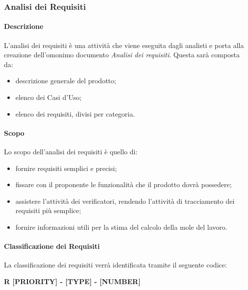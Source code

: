 \subsubsection{Analisi dei Requisiti}
\paragraph{Descrizione} \hfill \break
L'analisi dei requisiti è una attività che viene eseguita dagli analisti e porta alla creazione 
dell'omonimo documento \textit{Analisi dei requisiti}.
Questa sarà composta da:
\begin{itemize}
  \item descrizione generale del prodotto;
  \item elenco dei Casi d'Uso;
  \item elenco dei requisiti, divisi per categoria.
\end{itemize}

\paragraph{Scopo} \hfill \break
Lo scopo dell'analisi dei requisiti è quello di:
\begin{itemize}
  \item fornire requisiti semplici e precisi;
  \item fissare con il proponente le funzionalità che il prodotto dovrà possedere;
  \item assistere l'attività dei verificatori, rendendo l'attività di tracciamento dei requisiti più semplice;
  \item fornire informazioni utili per la stima del calcolo della mole del lavoro.
\end{itemize}

\paragraph{Classificazione dei Requisiti} \hfill \break
La classificazione dei requisiti verrà identificata tramite il seguente codice: 
\begin{center}
  \textbf{R [PRIORITY] - [TYPE] - [NUMBER]}
\end{center}

